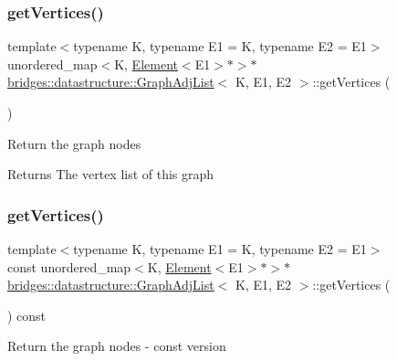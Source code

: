 \subsubsection{\texorpdfstring{get\+Vertices()}{getVertices()}\hspace{0.1cm}{\footnotesize\ttfamily [1/2]}}
{\footnotesize\ttfamily template$<$typename K, typename E1 = K, typename E2 = E1$>$ \\
unordered\+\_\+map$<$K, \hyperlink{classbridges_1_1datastructure_1_1_element}{Element}$<$E1$>$$\ast$$>$$\ast$ \hyperlink{classbridges_1_1datastructure_1_1_graph_adj_list}{bridges\+::datastructure\+::\+Graph\+Adj\+List}$<$ K, E1, E2 $>$\+::get\+Vertices (\begin{DoxyParamCaption}{ }\end{DoxyParamCaption})\hspace{0.3cm}{\ttfamily [inline]}}

Return the graph nodes

\begin{DoxyReturn}{Returns}
The vertex list of this graph 
\end{DoxyReturn}
\mbox{\label{classbridges_1_1datastructure_1_1_graph_adj_list_a77b21cfdb87c4cf45ce29be6e7dd9791}} 
\subsubsection{\texorpdfstring{get\+Vertices()}{getVertices()}\hspace{0.1cm}{\footnotesize\ttfamily [2/2]}}
{\footnotesize\ttfamily template$<$typename K, typename E1 = K, typename E2 = E1$>$ \\
const unordered\+\_\+map$<$K, \hyperlink{classbridges_1_1datastructure_1_1_element}{Element}$<$E1$>$$\ast$$>$$\ast$ \hyperlink{classbridges_1_1datastructure_1_1_graph_adj_list}{bridges\+::datastructure\+::\+Graph\+Adj\+List}$<$ K, E1, E2 $>$\+::get\+Vertices (\begin{DoxyParamCaption}{ }\end{DoxyParamCaption}) const\hspace{0.3cm}{\ttfamily [inline]}}

Return the graph nodes -\/ const version

